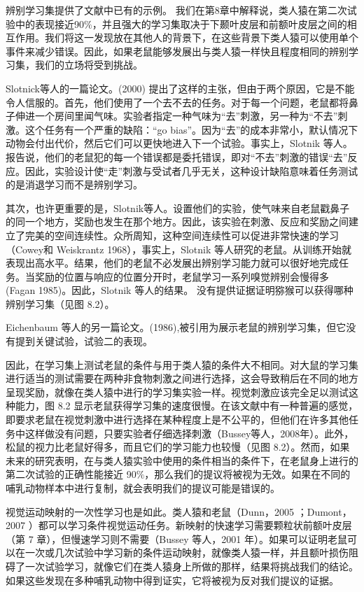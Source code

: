\par 
辨别学习集提供了文献中已有的示例。 我们在第8章中解释说，类人猿在第二次试验中的表现接近90$\%$，并且强大的学习集取决于下颞叶皮层和前额叶皮层之间的相互作用。我们将这一发现放在其他人的背景下，在这些背景下类人猿可以使用单个事件来减少错误。因此，如果老鼠能够发展出与类人猿一样快且程度相同的辨别学习集，我们的立场将受到挑战。
\par 
Slotnick等人的一篇论文。(2000) 提出了这样的主张，但由于两个原因，它是不能令人信服的。首先，他们使用了一个去不去的任务。对于每一个问题，老鼠都将鼻子伸进一个房间里闻气味。实验者指定一种气味为“去”刺激，另一种为“不去”刺激。这个任务有一个严重的缺陷：“go bias”。因为“去”的成本非常小，默认情况下动物会付出代价，然后它们可以更快地进入下一个试验。事实上，Slotnik 等人。报告说，他们的老鼠犯的每一个错误都是委托错误，即对“不去”刺激的错误“去”反应。因此，实验设计使“走”刺激与受试者几乎无关，这种设计缺陷意味着任务测试的是消退学习而不是辨别学习。
\par 
其次，也许更重要的是，Slotnik等人。设置他们的实验，使气味来自老鼠戳鼻子的同一个地方，奖励也发生在那个地方。因此，该实验在刺激、反应和奖励之间建立了完美的空间连续性。众所周知，这种空间连续性可以促进非常快速的学习（Cowey和 Weiskrantz 1968），事实上，Slotnik 等人研究的老鼠。从训练开始就表现出高水平。结果，他们的老鼠不必发展出辨别学习能力就可以很好地完成任务。当奖励的位置与响应的位置分开时，老鼠学习一系列嗅觉辨别会慢得多 (Fagan 1985)。因此，Slotnik 等人的结果。 没有提供证据证明猕猴可以获得哪种辨别学习集（见图 8.2）。
\par 
Eichenbaum 等人的另一篇论文。(1986),被引用为展示老鼠的辨别学习集，但它没有提到关键试验，试验二的表现。
\par 
因此，在学习集上测试老鼠的条件与用于类人猿的条件大不相同。对大鼠的学习集进行适当的测试需要在两种非食物刺激之间进行选择，这会导致稍后在不同的地方呈现奖励，就像在类人猿中进行的学习集实验一样。视觉刺激应该完全足以测试这种能力，图 8.2 显示老鼠获得学习集的速度很慢。在该文献中有一种普遍的感觉，即要求老鼠在视觉刺激中进行选择在某种程度上是不公平的，但他们在许多其他任务中这样做没有问题，只要实验者仔细选择刺激（Bussey等人，2008年）。此外，松鼠的视力比老鼠好得多，而且它们的学习能力也较慢（见图 8.2）。然而，如果未来的研究表明，在与类人猿实验中使用的条件相当的条件下，在老鼠身上进行的第二次试验的正确性能接近 90$\%$，那么我们的提议将被视为无效。如果在不同的哺乳动物样本中进行复制，就会表明我们的提议可能是错误的。
\par 
视觉运动映射的一次性学习也是如此。类人猿和老鼠（Dunn，2005 ；Dumont，2007 ）都可以学习条件视觉运动任务。新映射的快速学习需要颗粒状前额叶皮层（第 7 章），但慢速学习则不需要（Bussey 等人，2001 年）。如果可以证明老鼠可以在一次或几次试验中学习新的条件运动映射，就像类人猿一样，并且额叶损伤阻碍了一次试验学习，就像它们在类人猿身上所做的那样，结果将挑战我们的结论。如果这些发现在多种哺乳动物中得到证实，它将被视为反对我们提议的证据。
